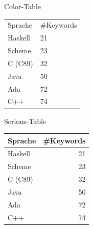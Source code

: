 \documentclass[xcolor={dvipsnames,table}]{beamer}
\begin{document}
\begin{frame}{Color-Table}
\begin{tabular}{ll}
  \rowcolor{black}
  \color{white} Sprache & \color{white} \#Keywords \\
 Haskell &  21 \\
 Scheme &  23 \\
 C (C89) &  32 \\
 Java &  50 \\
 Ada &  72 \\
 C++ &  74 \\
\end{tabular}
\end{frame}

\begin{frame}{Serious-Table}
\begin{tabular}{lr}
 \toprule
 Sprache & \#Keywords \\
 \midrule
 Haskell &  21 \\
 Scheme &  23 \\
 C (C89) &  32 \\
 Java &  50 \\
 Ada &  72 \\
 C++ &  74 \\
 \bottomrule
\end{tabular}
\end{frame}
\end{document}
